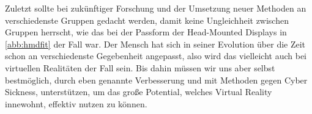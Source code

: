 Zuletzt sollte bei zuk\"unftiger Forschung und der Umsetzung neuer Methoden an verschiedenste Gruppen gedacht werden, damit keine Ungleichheit zwischen Gruppen herrscht, wie das bei der Passform der Head-Mounted Displays in \autoref{abb:hmdfit} der Fall war. Der Mensch hat sich in seiner Evolution \"uber die Zeit schon an verschiedenste Gegebenheit angepasst, also wird das vielleicht auch bei virtuellen Realit\"aten der Fall sein. Bis dahin m\"ussen wir uns aber selbst bestm\"oglich, durch eben genannte Verbesserung und mit Methoden gegen Cyber Sickness, unterst\"utzen, um das gro{\ss}e Potential, welches Virtual Reality innewohnt, effektiv nutzen zu k\"onnen.

